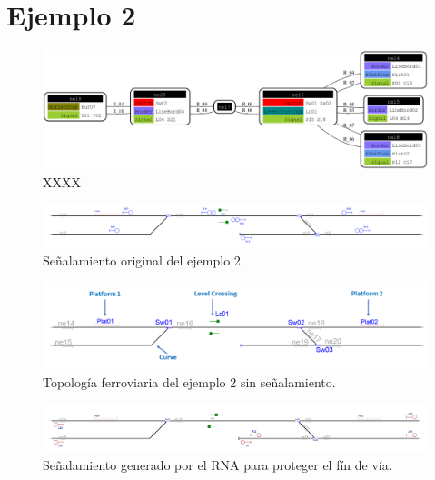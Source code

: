 \section{Ejemplo 2}

    \lipsum[1]
    
    \begin{figure}[h]
    	\centering
    	\includegraphics[width=1\textwidth]{Figuras/Graph_2}
    	\centering\caption{XXXX}
    \end{figure}
    
    \lipsum[1]

    \begin{figure}[h]
        \centering
        \includegraphics[width=1\textwidth]{resultados-obtenidos/ejemplo2/images/2_original.png}
        \centering\caption{Señalamiento original del ejemplo 2.}
    \end{figure}

    \begin{figure}[h]
        \centering
        \includegraphics[width=1\textwidth]{resultados-obtenidos/ejemplo2/images/2_empty.png}
        \centering\caption{Topología ferroviaria del ejemplo 2 sin señalamiento.}
    \end{figure}

    \begin{figure}[h]
        \centering
        \includegraphics[width=1\textwidth]{resultados-obtenidos/ejemplo2/images/2_step1.png}
        \centering\caption{Señalamiento generado por el RNA para proteger el fín de vía.}
    \end{figure}


